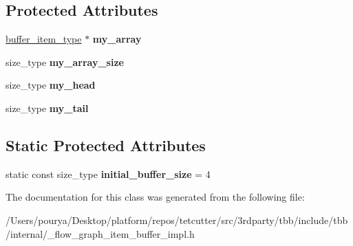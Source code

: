 \subsection*{Protected Attributes}
\begin{DoxyCompactItemize}
\item 
\hypertarget{classinternal_1_1item__buffer_a2af9e50a0bdb3fe7d8c16e48a8556b53}{}\hyperlink{structinternal_1_1type__plus__align}{buffer\+\_\+item\+\_\+type} $\ast$ {\bfseries my\+\_\+array}\label{classinternal_1_1item__buffer_a2af9e50a0bdb3fe7d8c16e48a8556b53}

\item 
\hypertarget{classinternal_1_1item__buffer_aa9a5f7bf5340add848ec0ccb5d29e87c}{}size\+\_\+type {\bfseries my\+\_\+array\+\_\+size}\label{classinternal_1_1item__buffer_aa9a5f7bf5340add848ec0ccb5d29e87c}

\item 
\hypertarget{classinternal_1_1item__buffer_a9d562cbe81a1620bc3d695e8f279212a}{}size\+\_\+type {\bfseries my\+\_\+head}\label{classinternal_1_1item__buffer_a9d562cbe81a1620bc3d695e8f279212a}

\item 
\hypertarget{classinternal_1_1item__buffer_a343ec2a2b335bbbaa4226542abc57670}{}size\+\_\+type {\bfseries my\+\_\+tail}\label{classinternal_1_1item__buffer_a343ec2a2b335bbbaa4226542abc57670}

\end{DoxyCompactItemize}
\subsection*{Static Protected Attributes}
\begin{DoxyCompactItemize}
\item 
\hypertarget{classinternal_1_1item__buffer_a332d99d9416e3b34d73ba9ff606e6b2e}{}static const size\+\_\+type {\bfseries initial\+\_\+buffer\+\_\+size} = 4\label{classinternal_1_1item__buffer_a332d99d9416e3b34d73ba9ff606e6b2e}

\end{DoxyCompactItemize}


The documentation for this class was generated from the following file\+:\begin{DoxyCompactItemize}
\item 
/\+Users/pourya/\+Desktop/platform/repos/tetcutter/src/3rdparty/tbb/include/tbb/internal/\+\_\+flow\+\_\+graph\+\_\+item\+\_\+buffer\+\_\+impl.\+h\end{DoxyCompactItemize}
